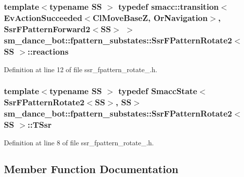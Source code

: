 \subsubsection[{\texorpdfstring{reactions}{reactions}}]{\setlength{\rightskip}{0pt plus 5cm}template$<$typename SS $>$ typedef {\bf smacc\+::transition}$<$Ev\+Action\+Succeeded$<${\bf Cl\+Move\+BaseZ}, {\bf Or\+Navigation}$>$, {\bf Ssr\+F\+Pattern\+Forward2}$<$SS$>$ $>$ {\bf sm\+\_\+dance\+\_\+bot\+::fpattern\+\_\+substates\+::\+Ssr\+F\+Pattern\+Rotate2}$<$ SS $>$\+::{\bf reactions}}\hypertarget{structsm__dance__bot_1_1fpattern__substates_1_1SsrFPatternRotate2_a66267747e1f4c79d8b9d1b3383c5d019}{}\label{structsm__dance__bot_1_1fpattern__substates_1_1SsrFPatternRotate2_a66267747e1f4c79d8b9d1b3383c5d019}


Definition at line 12 of file ssr\+\_\+fpattern\+\_\+rotate\+\_.\+h.

\subsubsection[{\texorpdfstring{T\+Ssr}{TSsr}}]{\setlength{\rightskip}{0pt plus 5cm}template$<$typename SS $>$ typedef {\bf Smacc\+State}$<${\bf Ssr\+F\+Pattern\+Rotate2}$<$SS$>$, SS$>$ {\bf sm\+\_\+dance\+\_\+bot\+::fpattern\+\_\+substates\+::\+Ssr\+F\+Pattern\+Rotate2}$<$ SS $>$\+::{\bf T\+Ssr}}\hypertarget{structsm__dance__bot_1_1fpattern__substates_1_1SsrFPatternRotate2_aa62bec69230573c885a76fafba728377}{}\label{structsm__dance__bot_1_1fpattern__substates_1_1SsrFPatternRotate2_aa62bec69230573c885a76fafba728377}


Definition at line 8 of file ssr\+\_\+fpattern\+\_\+rotate\+\_.\+h.



\subsection{Member Function Documentation}
